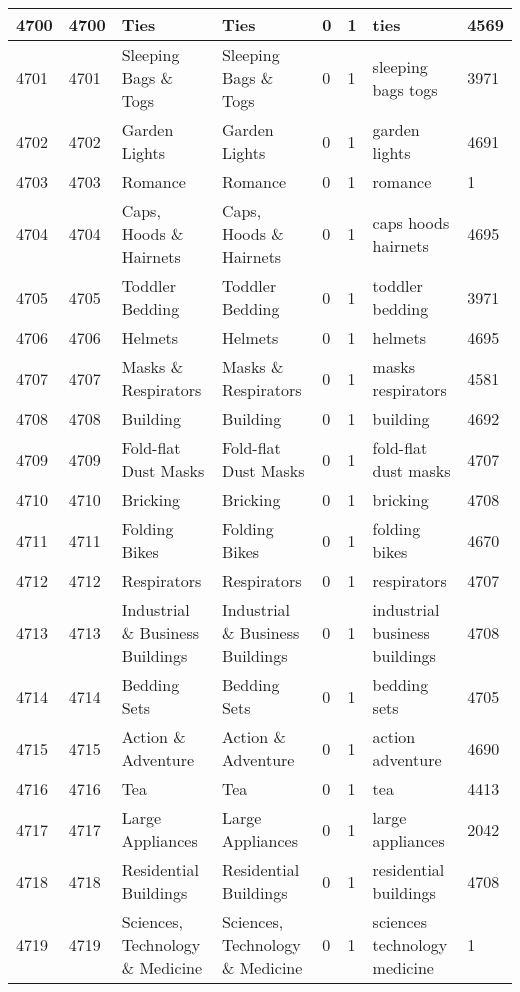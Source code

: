 \begin{longtable}{|l|l|l|l|l|l|l|l|}
4700 & 4700 & Ties & Ties & 0 & 1 & ties & 4569 \\ \hline 
4701 & 4701 & Sleeping Bags \& Togs & Sleeping Bags \& Togs & 0 & 1 & sleeping bags togs & 3971 \\ \hline 
4702 & 4702 & Garden Lights & Garden Lights & 0 & 1 & garden lights & 4691 \\ \hline 
4703 & 4703 & Romance & Romance & 0 & 1 & romance & 1 \\ \hline 
4704 & 4704 & Caps, Hoods \& Hairnets & Caps, Hoods \& Hairnets & 0 & 1 & caps hoods hairnets & 4695 \\ \hline 
4705 & 4705 & Toddler Bedding & Toddler Bedding & 0 & 1 & toddler bedding & 3971 \\ \hline 
4706 & 4706 & Helmets & Helmets & 0 & 1 & helmets & 4695 \\ \hline 
4707 & 4707 & Masks \& Respirators & Masks \& Respirators & 0 & 1 & masks respirators & 4581 \\ \hline 
4708 & 4708 & Building & Building & 0 & 1 & building & 4692 \\ \hline 
4709 & 4709 & Fold-flat Dust Masks & Fold-flat Dust Masks & 0 & 1 & fold-flat dust masks & 4707 \\ \hline 
4710 & 4710 & Bricking & Bricking & 0 & 1 & bricking & 4708 \\ \hline 
4711 & 4711 & Folding Bikes & Folding Bikes & 0 & 1 & folding bikes & 4670 \\ \hline 
4712 & 4712 & Respirators & Respirators & 0 & 1 & respirators & 4707 \\ \hline 
4713 & 4713 & Industrial \& Business Buildings & Industrial \& Business Buildings & 0 & 1 & industrial business buildings & 4708 \\ \hline 
4714 & 4714 & Bedding Sets & Bedding Sets & 0 & 1 & bedding sets & 4705 \\ \hline 
4715 & 4715 & Action \& Adventure & Action \& Adventure & 0 & 1 & action adventure & 4690 \\ \hline 
4716 & 4716 & Tea & Tea & 0 & 1 & tea & 4413 \\ \hline 
4717 & 4717 & Large Appliances & Large Appliances & 0 & 1 & large appliances & 2042 \\ \hline 
4718 & 4718 & Residential Buildings & Residential Buildings & 0 & 1 & residential buildings & 4708 \\ \hline 
4719 & 4719 & Sciences, Technology \& Medicine & Sciences, Technology \& Medicine & 0 & 1 & sciences technology medicine & 1 \\ \hline 

\end{longtable}
